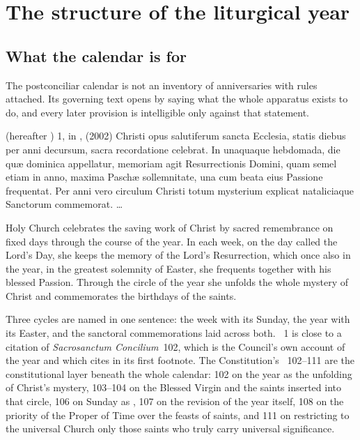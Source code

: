 \section{The structure of the liturgical year}
\label{sec:structure}

\subsection{What the calendar is for}

The postconciliar calendar is not an inventory of anniversaries with rules attached. Its
governing text opens by saying what the whole apparatus exists to do, and every later
provision is intelligible only against that statement.

\begin{normtext}{ (hereafter ) 1, in ,  (2002)}
Christi opus salutiferum sancta Ecclesia, statis diebus per anni decursum, sacra recordatione
celebrat. In unaquaque hebdomada, die quæ dominica appellatur, memoriam agit Resurrectionis
Domini, quam semel etiam in anno, maxima Paschæ sollemnitate, una cum beata eius Passione
frequentat. Per anni vero circulum Christi totum mysterium explicat nataliciaque Sanctorum
commemorat. \dots
\end{normtext}

\begin{workingrendering}
Holy Church celebrates the saving work of Christ by sacred remembrance on fixed days through
the course of the year. In each week, on the day called the Lord's Day, she keeps the memory of
the Lord's Resurrection, which once also in the year, in the greatest solemnity of Easter, she
frequents together with his blessed Passion. Through the circle of the year she unfolds the whole
mystery of Christ and commemorates the birthdays of the saints.
\end{workingrendering}

Three cycles are named in one sentence: the week with its Sunday, the year with its Easter, and the
sanctoral commemorations laid across both. ~1 is close to a citation of
\emph{Sacrosanctum Concilium}~102, which is the Council's own account of the year and which
 cites in its first footnote. The Constitution's ~102--111 are the
constitutional layer beneath the whole calendar: 102 on the year as the unfolding of Christ's
mystery, 103--104 on the Blessed Virgin and the saints inserted into that circle, 106 on Sunday as
, 107 on the revision of the year itself, 108 on the priority of the
Proper of Time over the feasts of saints, and 111 on restricting to the universal Church only those
saints who truly carry universal significance.

